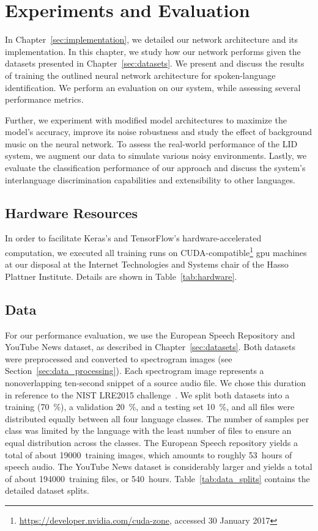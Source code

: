 \section{Experiments and Evaluation}
\label{sec:evaluation}
In Chapter~\ref{sec:implementation}, we detailed our network architecture and its implementation. In this chapter, we study how our network performs given the datasets presented in Chapter~\ref{sec:datasets}. We present and discuss the results of training the outlined neural network architecture for spoken-language identification. We perform an evaluation on our system, while assessing several performance metrics.

Further, we experiment with modified model architectures to maximize the model's accuracy, improve its noise robustness and study the effect of background music on the neural network. To assess the real-world performance of the LID system, we augment our data to simulate various noisy environments. Lastly, we evaluate the classification performance of our approach and discuss the system's interlanguage discrimination capabilities and extensibility to other languages.

\subsection{Hardware Resources}
\label{sec:hardware}
	In order to facilitate Keras's and TensorFlow's hardware-accelerated computation, we executed all training runs on CUDA-compatible\footnote{\url{https://developer.nvidia.com/cuda-zone}, accessed 30 January 2017} \ac{gpu} machines at our disposal at the Internet Technologies and Systems chair of the Hasso Plattner Institute. Details are shown in Table~\ref{tab:hardware}.




\subsection{Data}
\label{sec:data}
	For our performance evaluation, we use the European Speech Repository and YouTube News dataset, as described in Chapter~\ref{sec:datasets}. Both datasets were preprocessed and converted to spectrogram images (see Section~\ref{sec:data_processing}). Each spectrogram image represents a nonoverlapping ten-second snippet of a source audio file. We chose this duration in reference to the NIST LRE2015 challenge~\cite{lre2015}. We split both datasets into a training (\SI{70}{\percent}), a validation \SI{20}{\percent}, and a testing set \SI{10}{\percent}, and all files were distributed equally between all four language classes. The number of samples per class was limited by the language with the least number of files to ensure an equal distribution across the classes. The European Speech repository yields a total of about \num{19000}~training images, which amounts to roughly \num{53}~hours of speech audio. The YouTube News dataset is considerably larger and yields a total of about \num{194000}~training files, or \num{540}~hours. Table~\ref{tab:data_splits} contains the detailed dataset splits.

